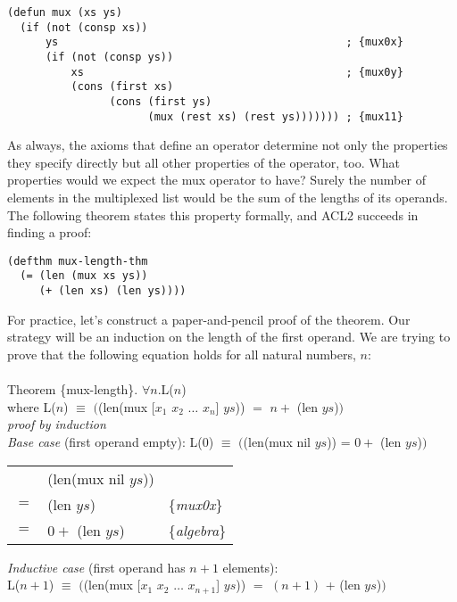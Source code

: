 \label{mux-defun}
\begin{code}
\begin{verbatim}
(defun mux (xs ys)
  (if (not (consp xs))
      ys                                             ; {mux0x}
      (if (not (consp ys))
          xs                                         ; {mux0y}
          (cons (first xs)
                (cons (first ys)
                      (mux (rest xs) (rest ys))))))) ; {mux11}
\end{verbatim}
\end{code}

As always, the axioms that define an operator
determine not only the properties they specify directly
but all other properties of the operator, too.
What properties would we expect the \textsf{mux} operator to have?
Surely the number of elements in the multiplexed list
would be the sum of the lengths of its operands.
The following theorem states this property formally,
and ACL2 succeeds in finding a proof:

\label{mux-length-thm}
\begin{code}
\begin{verbatim}
(defthm mux-length-thm
  (= (len (mux xs ys))
     (+ (len xs) (len ys))))
\end{verbatim}
\end{code}

For practice, let's construct a paper-and-pencil proof of the theorem. %
Our strategy will be an induction on the length of the first operand.
We are trying to prove that the following equation holds for all natural numbers, $n$:\\
~\\
Theorem \{mux-length\}. $\forall n.$L($n$)\\
where L($n$) $\equiv$ $($\textsf{(len(mux [$x_1$ $x_2$ $\dots$ $x_n$] $ys$)) $=$ $n +$ (len $ys$)}$)$\\
\emph{proof by induction}\\
\emph{Base case} (first operand empty): L($0$) $\equiv$ $($\textsf{(len(mux nil $ys$)) = $0 +$ (len $ys$)}$)$
~\\[-1.0em]
\begin{center}
\begin{tabular}{lll}
     & \textsf{(len(mux nil $ys$)})    &                   \\
 $=$ & \textsf{(len $ys$)}             & \{\emph{mux0x}\}  \\
 $=$ & \textsf{$0 +$ (len $ys$)}       & \{\emph{algebra}\}\\
\end{tabular}
\end{center}
\label{mux-length-thm-induc-case}\emph{Inductive case} (first operand has $n+1$ elements):\\
\hspace*{1cm}L($n+1$) $\equiv$ $($\textsf{(len(mux [$x_1$ $x_2$ $\dots$ $x_{n+1}$] $ys$)) $=$ $(n+1)$ + (len $ys$)}$)$

